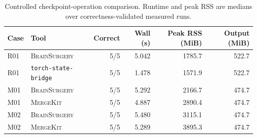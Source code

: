 \begin{table}[t]
\centering
\small
\begin{tabular}{llrrrr}
\toprule
Case & Tool & Correct & Wall (s) & Peak RSS (MiB) & Output (MiB) \\
\midrule
R01 & \textsc{BrainSurgery} & 5/5 & 5.042 & 1785.7 & 522.7 \\
R01 & \texttt{torch-state-bridge} & 5/5 & 1.478 & 1571.9 & 522.7 \\
M01 & \textsc{BrainSurgery} & 5/5 & 5.292 & 2166.7 & 474.7 \\
M01 & \textsc{MergeKit} & 5/5 & 4.887 & 2890.4 & 474.7 \\
M02 & \textsc{BrainSurgery} & 5/5 & 5.480 & 3115.1 & 474.7 \\
M02 & \textsc{MergeKit} & 5/5 & 5.289 & 3895.3 & 474.7 \\
\bottomrule
\end{tabular}
\caption{Controlled checkpoint-operation comparison. Runtime and peak RSS are medians over correctness-validated measured runs.}
\label{tab:competing-tools}
\end{table}

